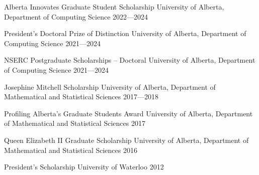\begin{cvhonors}
  \cvhonor
    {Alberta Innovates Graduate Student Scholarship}
    {University of Alberta, Department of Computing Science}
    {2022---2024}

  \cvhonor
    {President’s Doctoral Prize of Distinction}
    {University of Alberta, Department of Computing Science}
    {2021---2024}

  \cvhonor
    {NSERC Postgraduate Scholarships – Doctoral}
    {University of Alberta, Department of Computing Science}
    {2021---2024}

  \cvhonor
    {Josephine Mitchell Scholarship}
    {University of Alberta, Department of Mathematical and Statistical Sciences}
    {2017---2018}

  \cvhonor
    {Profiling Alberta's Graduate Students Award}
    {University of Alberta, Department of Mathematical and Statistical Sciences}
    {2017}

  \cvhonor
    {Queen Elizabeth II Graduate Scholarship}
    {University of Alberta, Department of Mathematical and Statistical Sciences}
    {2016}


  \cvhonor
    {President's Scholarship}
    {University of Waterloo}
    {2012}

\end{cvhonors}

